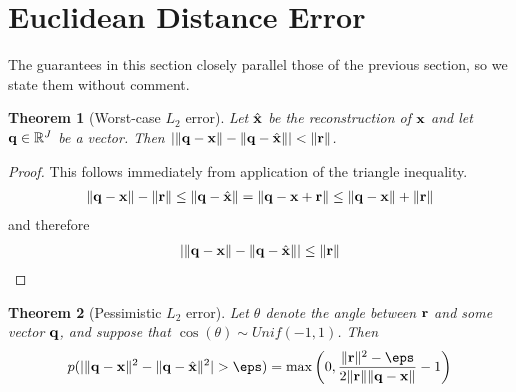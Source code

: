 \documentclass[]{article}
\newtheorem{theorem}{Theorem}[section]
\begin{document}

\section{Euclidean Distance Error}

The guarantees in this section closely parallel those of the previous section, so we state them without comment.


\begin{theorem}[Worst-case $L_2$ error] \label{thm:worst_l2}
Let $\hat{\mathbf{x}}$ be the reconstruction of $\mathbf{x}$ and let $\mathbf{q} \in \mathbb{R}^J$ be a vector. Then $\lvert\lVert\mathbf{q} - \mathbf{x}\rVert - \lVert\mathbf{q} - \hat{\mathbf{x}}\rVert \rvert < \lVert\mathbf{r}\rVert$.
\end{theorem}

\begin{proof}
This follows immediately from application of the triangle inequality. %
\begin{align}
   \lVert\mathbf{q} - \mathbf{x}\rVert - \lVert\mathbf{r}\rVert \le \lVert\mathbf{q} - \hat{\mathbf{x}}\rVert = \lVert\mathbf{q} - \mathbf{x} + \mathbf{r}\rVert \le \lVert\mathbf{q} - \mathbf{x}\rVert + \lVert\mathbf{r}\rVert
\end{align}
and therefore
\begin{align}
    \lvert\lVert\mathbf{q} - \mathbf{x}\rVert - \lVert\mathbf{q} - \hat{\mathbf{x}}\rVert \rvert \le \lVert\mathbf{r}\rVert
\end{align}
\end{proof}


\begin{theorem}[Pessimistic $L_2$ error]
Let $\theta$ denote the angle between $\mathbf{r}$ and some vector $\mathbf{q}$, and suppose that $\cos(\theta) \sim Unif(-1, 1)$. Then
\begin{align} \label{eq:l2_unif}
    p(\abs{ \norm{\q - \x}^2 - \norm{\q - \xhat}^2 } > \eps) = \max \left( 0, \frac{\norm{\r}^2 - \eps }{ 2\norm{\r}\norm{\q - \x} } - 1 \right)
\end{align}
\end{theorem}
\end{document}
